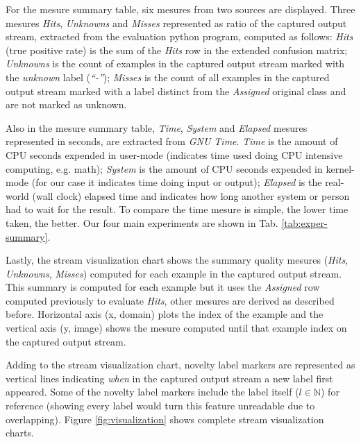 For the mesure summary table, six mesures from two sources are displayed. Three
mesures \emph{Hits}, \emph{Unknowns} and \emph{Misses} represented as ratio of
the captured output stream, extracted from the evaluation python program,
computed as follows:
\emph{Hits} (true positive rate) is the sum of the \emph{Hits} row in the
extended confusion matrix;
\emph{Unknowns} is the count of examples in the captured output stream marked
with the \emph{unknown} label (\emph{``-''});
\emph{Misses} is the count of all examples in the captured output stream marked
with a label distinct from the \emph{Assigned} original class and are not marked
as unknown.

Also in the mesure summary table, \emph{Time}, \emph{System} and \emph{Elapsed}
mesures represented in seconds, are extracted from \emph{GNU Time}.
\emph{Time} is the amount of CPU seconds expended in user-mode
(indicates time used doing CPU intensive computing, e.g. math);
\emph{System} is the amount of CPU seconds expended in kernel-mode
(for our case it indicates time doing input or output);
\emph{Elapsed} is the real-world (wall clock) elapsed time and
indicates how long another system or person had to wait for the result.
To compare the time mesure is simple, the lower time taken, the better.
Our four main experiments are shown in Tab. \ref{tab:exper-summary}.

Lastly, the stream visualization chart shows the summary quality mesures
(\emph{Hits}, \emph{Unknowns}, \emph{Misses})
computed for each example in the captured output stream.
This summary is computed for each example but it uses the \emph{Assigned} row
computed previously to evaluate \emph{Hits}, other mesures are derived as
described before.
Horizontal axis (x, domain) plots the index of the example and the
vertical axis (y, image) shows the mesure computed until that example index on the captured
output stream.

Adding to the stream visualization chart, novelty label markers are represented
as vertical lines indicating \emph{when} in the captured output stream a new
label first appeared.
Some of the novelty label markers include the label itself ($l \in \mathbb{N}$)
for reference (showing every label would turn this feature unreadable due
to overlapping).
Figure \ref{fig:visualization} shows complete stream visualization charts.

